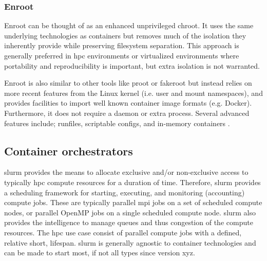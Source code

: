 \documentclass[conference]{IEEEtran}
\begin{document}
\subsubsection{Enroot}
Enroot can be thought of as an enhanced unprivileged chroot. It uses the same underlying technologies as containers but removes much of the isolation they inherently provide while preserving filesystem separation. This approach is generally preferred in \gls{hpc} environments or virtualized environments where portability and reproducibility is important, but extra isolation is not warranted.

Enroot is also similar to other tools like proot or fakeroot but instead relies on more recent features from the Linux kernel (i.e. user and mount namespaces), and provides facilities to import well known container image formats (e.g. Docker). Furthermore, it does not require a daemon or extra process. Several advanced features include; runfiles, scriptable configs, and in-memory containers \cite{nvidia-slurm-containers}.


\subsection{Container orchestrators}

\gls{slurm} provides the means to allocate exclusive and/or non-exclusive access to typically \gls{hpc} compute resources for a duration of time. Therefore, \gls{slurm} provides a scheduling framework for starting, executing, and monitoring (accounting) compute jobs. These are typically parallel \gls{mpi} jobs on a set of scheduled compute nodes, or parallel OpenMP jobs on a single scheduled compute node. \gls{slurm} also provides the intelligence to manage queues and thus congestion of the compute resources. The \gls{hpc} use case consist of parallel compute jobs with a defined, relative short, lifespan. \gls{slurm} is generally agnostic to container technologies and can be made to start most, if not all types since version xyz. 
\end{document}
